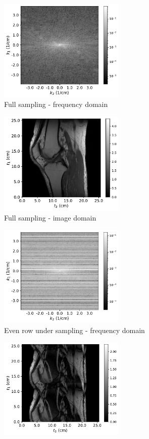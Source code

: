 \documentclass[12pt,twoside]{article}
\begin{document}
\begin{enumerate}
\begin{enumerate}
\begin{figure}[H] 
\centering
   \begin{subfigure}[]{.5\textwidth}
   \centering
        \includegraphics[width=60mm]{code/mr_undersampling/mri_samp_full_fft.pdf}
	\caption{Full sampling - frequency domain}
    \end{subfigure}%
   \begin{subfigure}[]{.5\textwidth}
   \centering   
        \includegraphics[width=60mm]{code/mr_undersampling/mri_samp_full.pdf}
        \caption{Full sampling - image domain}
    \end{subfigure}%
    \hspace{4pt}%
   \begin{subfigure}[]{.5\textwidth}
   \centering
        \includegraphics[width=60mm]{code/mr_undersampling/mri_undersampling_even_rows_fft.pdf}
	\caption{Even row under sampling - frequency domain}
    \end{subfigure}%
   \begin{subfigure}[]{.5\textwidth}
   \centering   
        \includegraphics[width=60mm]{code/mr_undersampling/mri_even_rows_recons.pdf}

\end{subfigure}
\end{figure}
\end{enumerate}
\end{enumerate}
\end{document}
